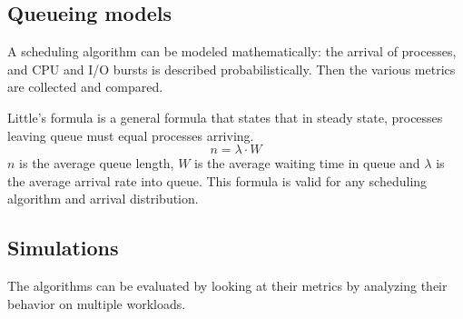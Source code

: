 \subsection{Queueing models}
A scheduling algorithm can be modeled mathematically: the arrival of processes, and CPU and I/O bursts is described probabilistically. Then the various metrics are collected and compared.

Little's formula is a general formula that states that in steady state, processes leaving queue must equal processes arriving.
$$ n = \lambda \cdot W $$
$n$ is the average queue length, $W$ is the average waiting time in queue and $\lambda$ is the average arrival rate into queue. This formula is valid for any scheduling algorithm and arrival distribution.

\subsection{Simulations}
The algorithms can be evaluated by looking at their metrics by analyzing their behavior on multiple workloads.